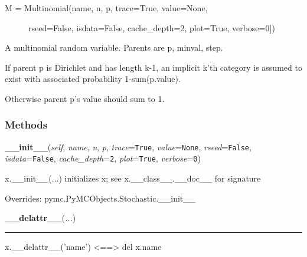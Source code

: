 \begin{description}
\item[{M = Multinomial(name, n, p, trace=True, value=None,}] \leavevmode 
rseed=False, isdata=False, cache{\_}depth=2, plot=True, verbose=0{]})

\end{description}

A multinomial random variable. Parents are p, minval, step.

If parent p is Dirichlet and has length k-1, an implicit k'th
category is assumed to exist with associated probability 1-sum(p.value).

Otherwise parent p's value should sum to 1.


  \subsubsection{Methods}

    \vspace{0.5ex}

    \begin{boxedminipage}{\textwidth}

    \raggedright \textbf{\_\_init\_\_}(\textit{self}, \textit{name}, \textit{n}, \textit{p}, \textit{trace}=\texttt{True}, \textit{value}=\texttt{None}, \textit{rseed}=\texttt{False}, \textit{isdata}=\texttt{False}, \textit{cache\_depth}=\texttt{2}, \textit{plot}=\texttt{True}, \textit{verbose}=\texttt{0})

    x.\_\_init\_\_(...) initializes x; see x.\_\_class\_\_.\_\_doc\_\_ for 
    signature

    \vspace{1ex}

      Overrides: pymc.PyMCObjects.Stochastic.\_\_init\_\_

    \end{boxedminipage}

    \label{object:__delattr__}

    \vspace{0.5ex}

    \begin{boxedminipage}{\textwidth}

    \raggedright \textbf{\_\_delattr\_\_}(\textit{...})

    \vspace{-1.5ex}

    \rule{\textwidth}{0.5\fboxrule}
    x.\_\_delattr\_\_('name') {\textless}=={\textgreater} del x.name

    \vspace{1ex}

    \end{boxedminipage}

